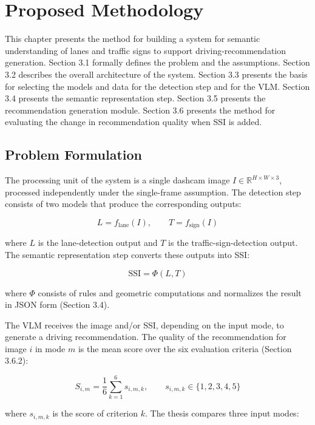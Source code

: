 \documentclass[12pt,a4paper]{report}
\begin{document}
\chapter{Proposed Methodology}

This chapter presents the method for building a system for semantic understanding of lanes and traffic signs to support driving-recommendation generation. Section 3.1 formally defines the problem and the assumptions. Section 3.2 describes the overall architecture of the system. Section 3.3 presents the basis for selecting the models and data for the detection step and for the VLM. Section 3.4 presents the semantic representation step. Section 3.5 presents the recommendation generation module. Section 3.6 presents the method for evaluating the change in recommendation quality when SSI is added.

\section{Problem Formulation}

The processing unit of the system is a single dashcam image $I \in \mathbb{R}^{H \times W \times 3}$, processed independently under the single-frame assumption. The detection step consists of two models that produce the corresponding outputs:

\[
L=f_{\mathrm{lane}}(I), \qquad T=f_{\mathrm{sign}}(I)
\]

where $L$ is the lane-detection output and $T$ is the traffic-sign-detection output. The semantic representation step converts these outputs into SSI:

\begin{equation}
\mathrm{SSI}=\Phi(L,T)
\label{eq:3.1}
\end{equation}

where $\Phi$ consists of rules and geometric computations and normalizes the result in JSON form (Section 3.4).

The VLM receives the image and/or SSI, depending on the input mode, to generate a driving recommendation. The quality of the recommendation for image $i$ in mode $m$ is the mean score over the six evaluation criteria (Section 3.6.2):

\begin{equation}
S_{i,m}=\frac{1}{6}\sum_{k=1}^{6}s_{i,m,k},
\qquad s_{i,m,k}\in\{1,2,3,4,5\}
\label{eq:3.2}
\end{equation}

where $s_{i,m,k}$ is the score of criterion $k$. The thesis compares three input modes:
\end{document}
